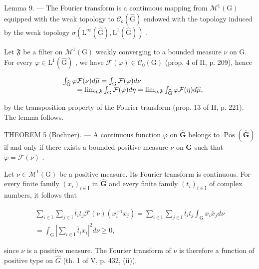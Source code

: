 Lemma 9. --- The Fourier transform is a continuous mapping from \(\mathcal{M}^{1}(\mathrm{G})\) equipped with the weak topology to \(\mathcal{C}_{b}(\widehat{\mathrm{G}})\) endowed with the topology induced by the weak topology \(\sigma(\mathrm{L}^{\infty}(\widehat{\mathrm{G}}),\mathrm{L}^{1}(\widehat{\mathrm{G}}))\) .

Let \(\mathfrak{F}\) be a filter on \(\mathcal{M}^1 (\mathrm{G})\) weakly converging to a bounded measure \(\nu\) on G. For every \(\varphi \in \mathrm{L}^1 (\widehat{\mathrm{G}})\) , we have \(\mathcal{F}(\varphi)\in \mathcal{C}_0(\mathrm{G})\) (prop. 4 of II, p. 209), hence

\[
\begin{array}{r l} & {\int_ {\widehat {\mathrm{G}}} \varphi \mathcal {F} (\nu) d \widehat {\mu} = \int_ {\mathrm{G}} \mathcal {F} (\varphi) d \nu} \\ & {\qquad = \lim _ {\eta , \mathfrak {F}} \int_ {\mathrm{G}} \mathcal {F} (\varphi) d \eta = \lim _ {\eta , \mathfrak {F}} \int_ {\widehat {\mathrm{G}}} \varphi \mathcal {F} (\eta) d \widehat {\mu},} \end{array}
\]

by the transposition property of the Fourier transform (prop. 13 of II, p. 221). The lemma follows.

THEOREM 5 (Bochner). --- A continuous function \(\varphi\) on \(\widehat{\mathbf{G}}\) belongs to \(\operatorname{Pos}(\widehat{\mathbf{G}})\) if and only if there exists a bounded positive measure \(\nu\) on \(\mathbf{G}\) such that \(\varphi = \mathcal{F}(\nu)\) .

Let \(\nu \in \mathcal{M}^{1}(\mathrm{G})\) be a positive measure. Its Fourier transform is continuous. For every finite family \((x_{i})_{i\in \mathrm{I}}\) in \(\widehat{\mathbf{G}}\) and every finite family \((t_i)_{i\in \mathrm{I}}\) of complex numbers, it follows that

\[
\begin{array}{r} \sum_ {i \in \mathrm{I}} \sum_ {j \in \mathrm{I}} \bar {t} _ {i} t _ {j} \mathcal {F} (\nu) (x _ {i} ^ {- 1} x _ {j}) = \sum_ {i \in \mathrm{I}} \sum_ {j \in \mathrm{I}} \bar {t} _ {i} t _ {j} \int_ {\mathrm{G}} x _ {i} \overline {{x}} _ {j} d \nu \\ = \int_ {\mathrm{G}} \left| \sum_ {i \in \mathrm{I}} \bar {t} _ {i} x _ {i} \right| ^ {2} d \nu \geqslant 0, \end{array}
\]

since \(\nu\) is a positive measure. The Fourier transform of \(\nu\) is therefore a function of positive type on \(\hat{G}\) (th. 1 of V, p. 432, (ii)).

